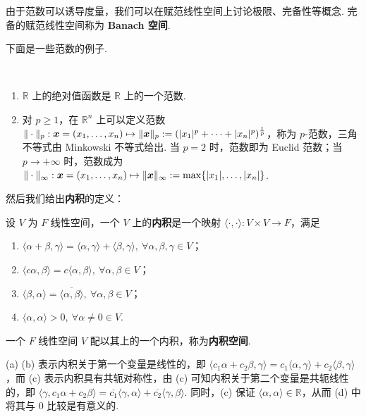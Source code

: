 \documentclass[../main.tex]{subfiles}
\begin{document}
由于范数可以诱导度量，我们可以在赋范线性空间上讨论极限、完备性等概念. 完备的赋范线性空间称为 \textbf{Banach 空间}. 

下面是一些范数的例子. 

\begin{example}[范数的例子]
    \ 
    \begin{enumerate}[label = (\alph*)]
        \item $\mathbb R$ 上的绝对值函数是 $\mathbb R$ 上的一个范数. 
        \item 对 $p \geqslant 1$，在 $\mathbb R^n$ 上可以定义范数 $\|\cdot\|_p : \boldsymbol x = (x_1, \dots, x_n) \mapsto \|\boldsymbol x\|_p := (|x_1|^p + \cdots + |x_n|^p)^\frac{1}{p}$，称为 $p$-范数，三角不等式由 Minkowski 不等式给出. 当 $p = 2$ 时，范数即为 Euclid 范数；当 $p \to +\infty$ 时，范数成为 $\|\cdot\|_\infty : \boldsymbol x = (x_1, \dots, x_n) \mapsto \|\boldsymbol x\|_\infty := \max\{|x_1|, \dots, |x_n|\}$. 
    \end{enumerate}
\end{example}

然后我们给出\textbf{内积}的定义：

\begin{definition}[内积的定义]
    设 $V$ 为 $F$ 线性空间，一个 $V$ 上的\textbf{内积}是一个映射 $\langle \cdot, \cdot \rangle:V \times V \to F$，满足
    \begin{enumerate}[label = (\alph*)]
        \item $\langle \alpha + \beta, \gamma \rangle = \langle \alpha, \gamma \rangle + \langle \beta, \gamma \rangle,\ \forall \alpha, \beta, \gamma \in V$；
        \item $\langle c\alpha, \beta \rangle = c \langle \alpha, \beta \rangle,\ \forall \alpha, \beta \in V$；
        \item $\langle \beta, \alpha \rangle = \overline{\langle \alpha, \beta \rangle},\ \forall \alpha, \beta \in V$；
        \item $\langle \alpha, \alpha \rangle > 0,\ \forall \alpha \neq 0 \in V$. 
    \end{enumerate}
    一个 $F$ 线性空间 $V$ 配以其上的一个内积，称为\textbf{内积空间}. 
\end{definition}

\begin{remark}
    (a) (b) 表示内积关于第一个变量是线性的，即 $\langle c_1\alpha + c_2\beta, \gamma \rangle = c_1 \langle \alpha, \gamma \rangle + c_2 \langle \beta, \gamma \rangle$，而 (c) 表示内积具有共轭对称性，由 (c) 可知内积关于第二个变量是共轭线性的，即 $\langle \gamma, c_1\alpha + c_2\beta \rangle = \overline{c_1} \langle \gamma, \alpha \rangle + \overline{c_2} \langle \gamma, \beta \rangle$. 同时，(c) 保证 $\langle \alpha, \alpha \rangle \in \mathbb R$，从而 (d) 中将其与 0 比较是有意义的. 
\end{remark}
\end{document}
